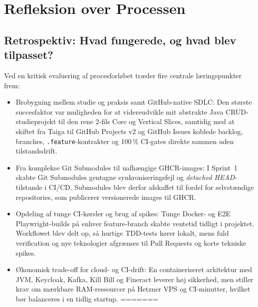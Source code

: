 \documentclass[11pt,a4paper]{article}
\begin{document}
\begin{table}[htbp]
\begin{table}[htbp]
\section{Refleksion over Processen}

\subsection{Retrospektiv: Hvad fungerede, og hvad blev tilpasset?}
Ved en kritisk evaluering af procesforløbet \cite{bloom1956} træder fire centrale læringspunkter frem:
\begin{itemize}[noitemsep]
<<<<<<< HEAD
    \item Brobygning mellem studie og praksis samt GitHub-native SDLC: Den største succesfaktor var muligheden for at videreudvikle mit abstrakte Java CRUD-studieprojekt til den rene 2-fils Core og Vertical Slices, samtidig med at skiftet fra Taiga til GitHub Projects v2 og GitHub Issues koblede backlog, branches, \texttt{.feature}-kontrakter og 100\,\% CI-gates direkte sammen uden tilstandsdrift.
    \item Fra komplekse Git Submodules til uafhængige GHCR-images: I Sprint~1 skabte Git Submodules gentagne synkroniseringsfejl og \textit{detached HEAD}-tilstande i CI/CD. Submodules blev derfor afskaffet til fordel for selvstændige repositories, som publicerer versionerede images til GHCR.
    \item Opdeling af tunge CI-kørsler og brug af spikes: Tunge Docker- og E2E Playwright-builds på enhver feature-branch skabte ventetid tidligt i projektet. Workflowet blev delt op, så hurtige TDD-tests kører lokalt, mens fuld verification og nye teknologier afgrænses til Pull Requests og korte tekniske spikes.
    \item Økonomisk trade-off for cloud- og CI-drift: En containeriseret arkitektur med JVM, Keycloak, Kafka, Kill Bill og Fineract leverer høj sikkerhed, men stiller krav om mærkbare RAM-ressourcer på Hetzner VPS og CI-minutter, hvilket bør balanceres i en tidlig startup.
=======

\end{itemize}
\end{table}
\end{table}
\end{document}
